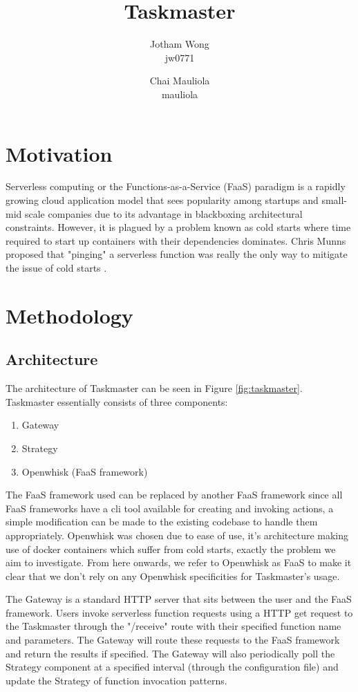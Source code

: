 \documentclass{article}
\title{Taskmaster}
\author{
    Jotham Wong\\
    jw0771\\
    \and
    Chai Mauliola\\
    mauliola
}
\begin{document}
\maketitle

\section{Motivation}

Serverless computing or the Functions-as-a-Service (FaaS) paradigm is a rapidly growing cloud application model that sees popularity among startups and small-mid scale companies due to its advantage in blackboxing architectural constraints. However, it is plagued by a problem known as cold starts where time required to start up containers with their dependencies dominates. Chris Munns proposed that "pinging" a serverless function was really the only way to mitigate the issue of cold starts \cite{jeremydaly}.

\section{Methodology}

\subsection{Architecture}

The architecture of Taskmaster can be seen in Figure \ref{fig:taskmaster}. Taskmaster essentially consists of three components: 
\begin{enumerate}
    \item Gateway
    \item Strategy
    \item Openwhisk (FaaS framework)
\end{enumerate}

The FaaS framework used can be replaced by another FaaS framework since all FaaS frameworks have a cli tool available for creating and invoking actions, a simple modification can be made to the existing codebase to handle them appropriately. Openwhisk was chosen due to ease of use, it's architecture making use of docker containers which suffer from cold starts, exactly the problem we aim to investigate. From here onwards, we refer to Openwhisk as FaaS to make it clear that we don't rely on any Openwhisk specificities for Taskmaster's usage.

The Gateway is a standard HTTP server that sits between the user and the FaaS framework. Users invoke serverless function requests using a HTTP get request to the Taskmaster through the "/receive" route with their specified function name and parameters. The Gateway will route these requests to the FaaS framework and return the results if specified. The Gateway will also periodically poll the Strategy component at a specified interval (through the configuration file) and update the Strategy of function invocation patterns.
\end{document}
